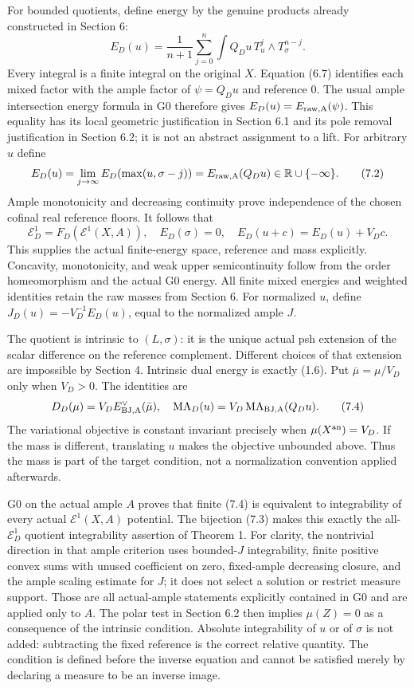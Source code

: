 \documentclass[
  10pt,
]{article}
\begin{document}
For bounded quotients, define energy by the genuine products already
constructed in Section 6: \[E_D(u)=\frac1{n+1}\sum_{j=0}^n\int Q_Du\,
T_u^j\wedge T_\sigma^{n-j}.\tag{7.1}\] Every integral is a finite
integral on the original \(X\). Equation (6.7) identifies each mixed
factor with the ample factor of \(\psi=Q_Du\) and reference \(0\). The
usual ample intersection energy formula in G0 therefore gives
\(E_D(u)=E_{\rm raw,A}(\psi)\). This equality has its local geometric
justification in Section 6.1 and its pole removal justification in
Section 6.2; it is not an abstract assignment to a lift. For arbitrary
\(u\) define \[E_D(u)=\lim_{j\to\infty}E_D(\max(u,\sigma-j))
=E_{\rm raw,A}(Q_Du)\in\mathbb R\cup\{-\infty\}.\tag{7.2}\] Ample
monotonicity and decreasing continuity prove independence of the chosen
cofinal real reference floors. It follows that
\[\mathcal E_D^1=F_D(\mathcal E^1(X,A)),\quad
E_D(\sigma)=0,\quad E_D(u+c)=E_D(u)+V_Dc.\tag{7.3}\] This supplies the
actual finite-energy space, reference and mass explicitly. Concavity,
monotonicity, and weak upper semicontinuity follow from the order
homeomorphism and the actual G0 energy. All finite mixed energies and
weighted identities retain the raw masses from Section 6. For normalized
\(u\), define \(J_D(u)=-V_D^{-1}E_D(u)\), equal to the normalized ample
\(J\).

The quotient is intrinsic to \((L,\sigma)\): it is the unique actual psh
extension of the scalar difference on the reference complement.
Different choices of that extension are impossible by Section 4.
Intrinsic dual energy is exactly (1.6). Put \(\bar\mu=\mu/V_D\) only
when \(V_D>0\). The identities are
\[D_D(\mu)=V_D E_{\rm BJ,A}^{\vee}(\bar\mu),\quad
\operatorname{MA}_D(u)=V_D\operatorname{MA}_{\rm BJ,A}(Q_Du).\tag{7.4}\]
The variational objective is constant invariant precisely when
\(\mu(X^{\rm an})=V_D\). If the mass is different, translating \(u\)
makes the objective unbounded above. Thus the mass is part of the target
condition, not a normalization convention applied afterwards.

G0 on the actual ample \(A\) proves that finite (7.4) is equivalent to
integrability of every actual \(\mathcal E^1(X,A)\) potential. The
bijection (7.3) makes this exactly the all-\(\mathcal E_D^1\) quotient
integrability assertion of Theorem 1. For clarity, the nontrivial
direction in that ample criterion uses bounded-\(J\) integrability,
finite positive convex sums with unused coefficient on zero, fixed-ample
decreasing closure, and the ample scaling estimate for \(J\); it does
not select a solution or restrict measure support. Those are all
actual-ample statements explicitly contained in G0 and are applied only
to \(A\). The polar test in Section 6.2 then implies \(\mu(Z)=0\) as a
consequence of the intrinsic condition. Absolute integrability of \(u\)
or of \(\sigma\) is not added: subtracting the fixed reference is the
correct relative quantity. The condition is defined before the inverse
equation and cannot be satisfied merely by declaring a measure to be an
inverse image.
\end{document}
